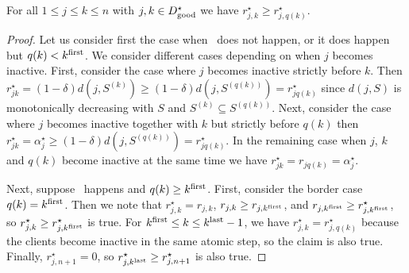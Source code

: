 \begin{lemma}
\label{lem:fr-r-mono-robust}
    For all $1 \le j \le k \le n$ with $j, k \in D^\star_{\mathrm{good}}$ we have $r^\star_{j,k} \ge r^\star_{j,q(k)}$.
\end{lemma}
\begin{proof}
    Let us consider first the case when \specialevent\ does not happen, or it does happen but $q(k) < k^{\mathrm{first}}$.
    We consider different cases depending on when $j$ becomes inactive. First, consider the case where $j$ becomes inactive strictly before $k$. Then $r^\star_{jk} = (1-\delta)d(j,S^{(k)}) \ge (1-\delta)d(j,S^{(q(k))}) = r^\star_{j q(k)}$ since $d(j, S)$ is monotonically decreasing with $S$ and $S^{(k)} \subseteq S^{(q(k))}$. Next, consider the case where $j$ becomes inactive together with $k$ but strictly before $q(k)$ then $r^\star_{jk} = \alpha^\star_j \ge (1-\delta)d(j,S^{(q(k))}) = r^\star_{jq(k)}$. In the remaining case when $j$, $k$ and $q(k)$ become inactive at the same time we have $r^\star_{jk} = r_{j q(k)} = \alpha^\star_j$.  

    Next, suppose \specialevent\ happens and $q(k) \geq k^{\mathrm{first}}$.
    First, consider the border case $q(k) = k^{\mathrm{first}}$.
    Then we note that $r^\star_{j,k} = r_{j, k}$, $r_{j, k} \geq r_{j, k^{\mathrm{first}}}$, and $r_{j, k^{\mathrm{first}}} \geq r^\star_{j,k^{\mathrm{first}}}$, so $r^\star_{j,k} \geq r^\star_{j,k^{\mathrm{first}}}$ is true.
    For $k^{\mathrm{first}} \leq k \leq k^{\mathrm{last}} - 1$, we have $r^\star_{j,k} = r^\star_{j,q(k)}$ because the clients become inactive in the same atomic step, so the claim is also true.
    Finally, $r^\star_{j,n+1}=0$, so $r^\star_{j,k^{\mathrm{last}}} \geq r^\star_{j,n+1}$ is also true.
\end{proof}

